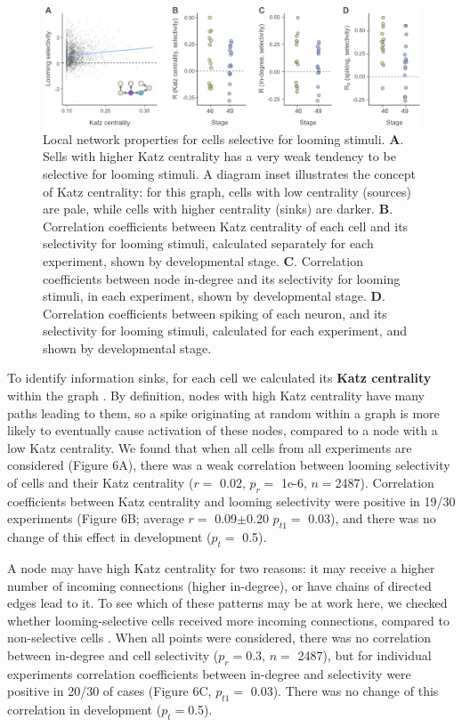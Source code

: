 \documentclass{article}
\begin{document}
\begin{figure}[t]
\includegraphics[width=\linewidth]{fig6.pdf}
\caption{
Local network properties for cells selective for looming stimuli. \textbf{A}. Sells with higher Katz centrality has a very weak tendency to be selective for looming stimuli. A diagram inset illustrates the concept of Katz centrality: for this graph, cells with low centrality (sources) are pale, while cells with higher centrality (sinks) are darker. \textbf{B}. Correlation coefficients between Katz centrality of each cell and its selectivity for looming stimuli, calculated separately for each experiment, shown by developmental stage. \textbf{C}. Correlation coefficients between node in-degree and its selectivity for looming stimuli, in each experiment, shown by developmental stage. \textbf{D}. Correlation coefficients between spiking of each neuron, and its selectivity for looming stimuli, calculated for each experiment, and shown by developmental stage. }
\end{figure}

To identify information sinks, for each cell we calculated its \textbf{Katz centrality} within the graph \citep{katz1953original,fletcher2018katz}. By definition, nodes with high Katz centrality have many paths leading to them, so a spike originating at random within a graph is more likely to eventually cause activation of these nodes, compared to a node with a low Katz centrality. We found that when all cells from all experiments are considered (Figure 6A), there was a weak correlation between looming selectivity of cells and their Katz centrality ($r =$ 0.02, $p_{r} =$ 1e-6, $n=$2487). Correlation coefficients between Katz centrality and looming selectivity were positive in 19/30 experiments (Figure 6B; average $r=$ 0.09$\pm$0.20 $p_{t1}=$ 0.03), and there was no change of this effect in development ($p_t=$ 0.5).

A node may have high Katz centrality for two reasons: it may receive a higher number of incoming connections (higher in-degree), or have chains of directed edges lead to it. To see which of these patterns may be at work here, we checked whether looming-selective cells received more incoming connections, compared to non-selective cells \citep{litwin2014assemblies}. When all points were considered, there was no correlation between in-degree and cell selectivity ($p_{r}=$0.3, $n=$ 2487), but for individual experiments correlation coefficients between in-degree and selectivity were positive in 20/30 of cases (Figure 6C, $p_{t1}=$ 0.03). There was no change of this correlation in development ($p_t=$0.5).
\end{document}
